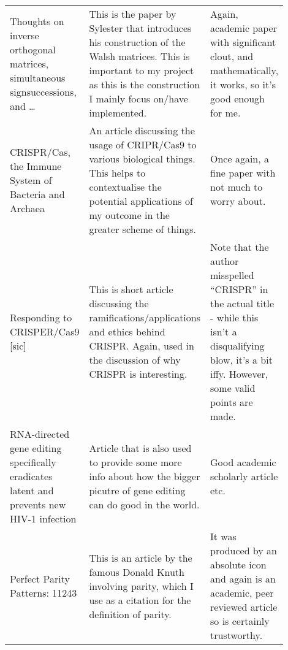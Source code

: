 \documentclass[a4paper,11pt]{article}
\begin{document}
\begin{center}
{\begin{longtable}{p{0.2\linewidth} p{0.35\linewidth} p{0.35\linewidth}}
    Thoughts on inverse orthogonal matrices, simultaneous
    signsuccessions, and \ldots \cite{OrthogonalMatrix1867Sylvester} &

    This is the paper by Sylester that introduces his construction of the Walsh
    matrices. This is important to my project as this is the construction I
    mainly focus on/have implemented. &

    Again, academic paper with significant clout, and mathematically, it works,
    so it's good enough for me. \\

    CRISPR/Cas, the Immune System of Bacteria and Archaea
    \cite{CRISPRImmune2010Horvath} &

    An article discussing the usage of CRIPR/Cas9 to various biological things.
    This helps to contextualise the potential applications of my outcome in the
    greater scheme of things. &

    Once again, a fine paper with not much to worry about. \\

    Responding to {CRISPER}\-/\-Cas9 [sic] \cite{CRISPER2016Finneran} &

    This is short article discussing the ramifications/applications and ethics
    behind CRISPR. Again, used in the discussion of why CRISPR is interesting. &

    Note that the author misspelled ``CRISPR'' in the actual title - while this
    isn't a disqualifying blow, it's a bit iffy. However, some valid points are
    made. \\

    RNA-directed gene editing specifically eradicates latent and prevents new
    HIV-1 infection \cite{RNAHIV2014Hu} &

    Article that is also used to provide some more info about how the bigger
    picutre of gene editing can do good in the world. &

    Good academic scholarly article etc.  \\

    Perfect Parity Patterns: 11243 \cite{Parity2008Knuth} &

    This is an article by the famous Donald Knuth involving parity, which I use
    as a citation for the definition of parity. &

    It was produced by an absolute icon and again is an academic, peer reviewed
    article so is certainly trustworthy.  \\

    \bottomrule
    \end{longtable}
    }
    \end{center}



\end{document}
